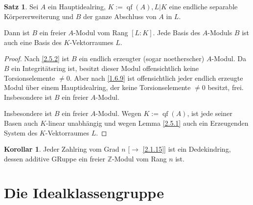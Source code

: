 \documentclass[
twoside=semi,
fontsize=12,
DIV=12, 
cleardoublepage=current,
leqno,
headings=optiontoheadandtoc, 
toc=idx
]{scrbook}
\newcommand{\Z}{\mathbb{Z}}
\DeclareMathOperator{\qf}{qf}
\theoremstyle{definition}
\newtheorem{satz}[definition]{Satz}
\newtheorem{korollar}[definition]{Korollar}
\begin{document}
 	\begin{satz}\label{2.5.5}
 		Sei $A$ ein Hauptidealring, $K:=\qf(A), L|K$ eine endliche separable K\"orpererweiterung und $B$ der ganze Abschluss von $A$ in $L$. 
 		
 		Dann ist $B$ ein freier $A$-Modul vom Rang $[L:K]$. Jede Basis des $A$-Moduls $B$ ist auch eine Basis des $K$-Vektorraumes $L$.
 		
 		\begin{proof}
 			Nach \ref{2.5.2} ist $B$ ein endlich erzeugter (sogar noetherscher) $A$-Modul. Da $B$ ein Integrit\"atsring ist, besitzt dieser Modul offensichtlich keine Torsionselemente $\neq 0$. Aber nach \ref{1.6.9} ist offensichtlich jeder endlich erzeugte Modul \"uber einem Hauptidealring, der keine Torsionselemente $\neq 0$ besitzt, frei. Insbesondere ist $B$ ein freier $A$-Modul.
 			
 			Insbesondere ist $B$ ein freier $A$-Modul. Wegen $K := \qf(A)$, ist jede seiner Basen auch $K$-linear unabh\"angig und wegen Lemma \ref{2.5.1} auch ein Erzeugenden System des $K$-Vektorraumes $L$.
 		\end{proof}
 	\end{satz}
 
 	\begin{korollar}\label{2.5.6}
 		Jeder Zahlring vom Grad $n$ [$\to$ \ref{2.1.15}] ist ein Dedekindring, dessen additive GRuppe ein freier $\Z$-Modul vom Rang $n$ ist.
 	\end{korollar}
 
 	\newpage
 	
 	\section{Die Idealklassengruppe}
 	
\end{document}
